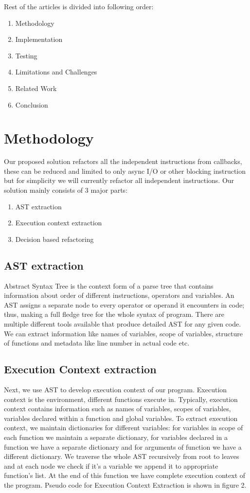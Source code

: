 \documentclass[10pt,conference]{IEEEtran}
\begin{document}
Rest of the articles is divided into following order:
\begin{enumerate}
	\item Methodology
	\item Implementation
	\item Testing
	\item Limitations and Challenges
	\item Related Work
	\item Conclusion

\end{enumerate}

\section{Methodology}
Our proposed solution refactors all the independent instructions from callbacks, these can be reduced and limited to only async I/O or other blocking instruction but for simplicity we will currently refactor all independent instructions. Our solution mainly consists of 3 major parts:
\begin{enumerate}
	\item AST extraction
	\item Execution context extraction
	\item Decision based refactoring
\end{enumerate}
\subsection{AST extraction}
Abstract Syntax Tree is the context form of a parse tree that contains information about order of different instructions, operators and variables. An AST assigns a separate node to every operator or operand it encounters in code; thus, making a full fledge tree for the whole syntax of program. There are multiple different tools available that produce detailed AST for any given code. We can extract information like names of variables, scope of variables, structure of functions and metadata like line number in actual code etc. 

\subsection{Execution Context extraction}
Next, we use AST to develop execution context of our program. Execution context is the environment, different functions execute in. Typically, execution context contains information such as names of variables, scopes of variables, variables declared within a function and global variables. To extract execution context, we maintain dictionaries for different variables: for variables in scope of each function we maintain a separate dictionary, for variables declared in a function we have a separate dictionary and for arguments of function we have a different dictionary. We traverse the whole AST recursively from root to leaves and at each node we check if it’s a variable we append it to appropriate function’s list. At the end of this function we have complete execution context of the program. Pseudo code for Execution Context Extraction is shown in figure 2.
\end{document}
